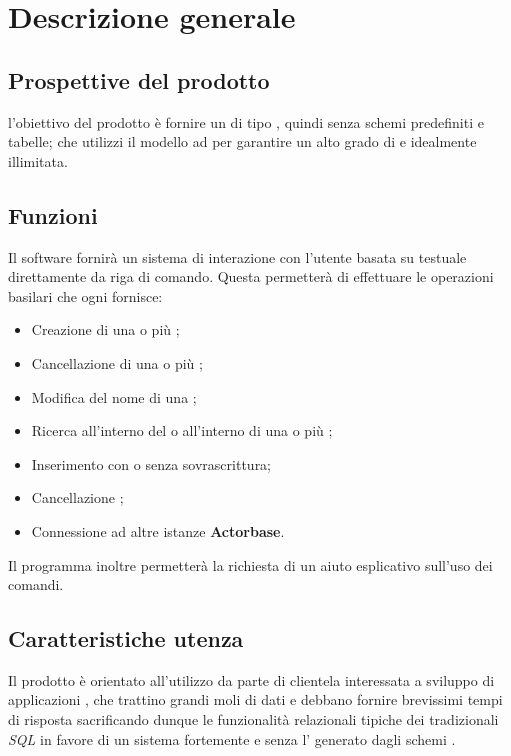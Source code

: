 \documentclass{scalatekids-article}
\begin{document}
\section{Descrizione generale}

\subsection{Prospettive del prodotto}

l'obiettivo del prodotto è fornire un   di tipo
, quindi senza schemi predefiniti e tabelle; che utilizzi il
modello ad  per garantire un alto grado di  e
 idealmente illimitata.

\subsection{Funzioni}

Il software fornirà un sistema di interazione con l'utente basata su 
testuale direttamente da riga di comando. Questa permetterà di effettuare le operazioni
basilari che ogni  fornisce:
\begin{itemize}
\item Creazione di una o più ;
\item Cancellazione di una o più ;
\item Modifica del nome di una ;
\item Ricerca all'interno del  o all'interno di una o più ;
\item Inserimento  con o senza sovrascrittura;
\item Cancellazione ;
\item Connessione ad altre istanze \textbf{Actorbase}.
\end{itemize}
Il programma inoltre permetterà la richiesta di un aiuto esplicativo sull'uso
dei comandi.

\subsection{Caratteristiche utenza}

Il prodotto è orientato all'utilizzo da parte di clientela interessata a
sviluppo di applicazioni , che trattino grandi moli di dati e
debbano fornire brevissimi tempi di risposta sacrificando dunque le funzionalità
relazionali tipiche dei tradizionali  \textit{SQL} in favore di
un sistema fortemente  e senza l' generato
dagli schemi .
\end{document}
